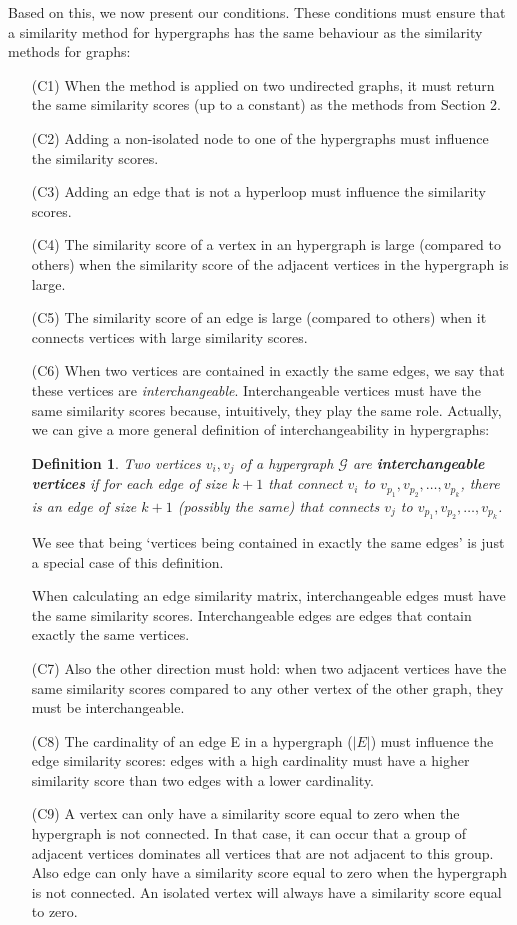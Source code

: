 \documentclass[a4paper,11pt]{report}
\newtheorem{definition}[theorem]{Definition}
\newcommand{\hgraf}{\mathcal{G}}
\begin{document}
Based on this, we now present our conditions. These conditions must ensure that 
a similarity method for hypergraphs has the same behaviour as the similarity 
methods for graphs:
\begin{itemize}
  \item[(C1)] When the method is applied on two undirected graphs, it must return the same 
  similarity scores (up to a constant) as the methods from Section 2.
  \item[(C2)] Adding a non-isolated node to one of the hypergraphs must influence 
  the similarity scores.
  \item[(C3)] Adding an edge that is not a hyperloop 
  must influence the similarity scores.
  \item[(C4)] The similarity score of a vertex in an hypergraph is large (compared to others) when the similarity score 
  of the adjacent vertices in the hypergraph is large.
  \item[(C5)] The similarity score of an edge is large (compared to others) when it connects vertices 
  with large similarity scores.
  \item[(C6)] When two vertices are contained in exactly the same edges, we say 
  that these vertices are \emph{interchangeable}. Interchangeable vertices must have 
  the same similarity scores because, intuitively, they play the same role. 
  Actually, we can give a more general definition of interchangeability in 
  hypergraphs:
  \begin{definition}\label{definterhyp}
    Two vertices $v_i, v_j$ of a hypergraph $\hgraf$ are \textbf{interchangeable 
    vertices}
  if for each edge of size $k+1$ that connect $v_i$ to $v_p_1, v_p_2,\ldots, v_p_k$, there is an edge of size $k+1$ (possibly the same) that connects
  $v_j$ to $v_p_1, v_p_2,\ldots, v_p_k$. 
  \end{definition}
  We see that being `vertices being contained in exactly the same edges' is just 
  a special case of this definition.
  
 When calculating 
  an edge similarity matrix, interchangeable edges must have the same similarity 
  scores. Interchangeable edges are edges that contain exactly the same 
  vertices.
  \item[(C7)] Also the other direction must hold: when two adjacent vertices have the same similarity scores compared
  to any other vertex of the other graph, they must 
  be interchangeable. 
  \item[(C8)] The cardinality of an edge E in a hypergraph ($|E|$) must 
  influence the edge similarity scores: edges with a high cardinality must have a higher similarity score than two edges with a lower cardinality.
      \item[(C9)] A vertex can only have a similarity score equal to zero when the hypergraph is not connected. In that case, it can occur that a group
  of adjacent vertices dominates all vertices that are not adjacent to this group. 
  Also edge can only have a similarity score equal to zero when the hypergraph is not connected. 
  An isolated vertex will always have a similarity score equal 
  to zero.   \end{itemize}  
 
\end{document}

